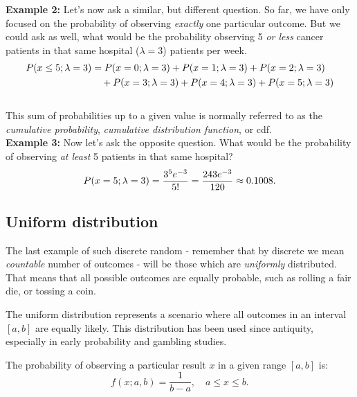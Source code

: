 \documentclass{book}
\begin{document}
\textbf{Example 2:} Let's now ask a similar, but different question. So far, we have only focused on the probability of observing \textit{exactly} one particular outcome. But we could ask as well, what would be the probability observing 5 \textit{or less} cancer patients in that same hospital ($\lambda = 3$) patients per week.
\begin{align}
    P(x \leq 5; \lambda = 3) &= P(x=0; \lambda = 3) + P(x=1; \lambda = 3) + P(x=2; \lambda = 3) \notag \\
    &\quad + P(x=3; \lambda = 3) + P(x=4; \lambda = 3) + P(x=5; \lambda = 3) \notag
\end{align}\\

This sum of probabilities up to a given value is normally referred to as the \textit{cumulative probability}, \textit{cumulative distribution function}, or cdf.\\

\textbf{Example 3:} Now let's ask the opposite question. What would be the probability of observing \textit{at least} 5 patients in that same hospital?
\begin{equation}
    P(x=5; \lambda = 3) = \frac{3^5 e^{-3}}{5!} = \frac{243 e^{-3}}{120} \approx 0.1008. \notag
\end{equation}

\newpage
\subsection{Uniform distribution}
The last example of such discrete random - remember that by discrete we mean \textit{countable} number of outcomes -  will be those which are \textit{uniformly} distributed. That means that all possible outcomes are equally probable, such as rolling a fair die, or tossing a coin.

The uniform distribution represents a scenario where all outcomes in an interval $[a, b]$ are equally likely. This distribution has been used since antiquity, especially in early probability and gambling studies.

The probability of observing a particular result $x$ in a given range $[a, b]$ is:
\begin{equation}
    f(x; a, b) = \frac{1}{b-a}, \quad a \leq x \leq b.
\end{equation}
\end{document}

